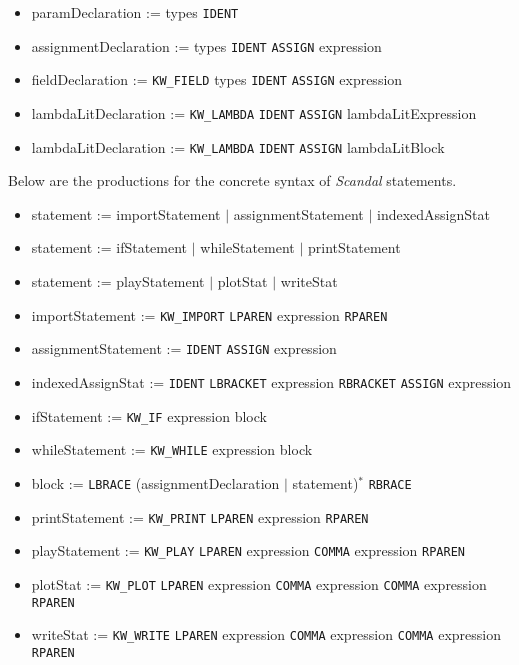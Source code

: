 \begin{itemize}
	\item paramDeclaration := types \texttt{IDENT}
	\item assignmentDeclaration := types \texttt{IDENT} \texttt{ASSIGN} expression
	\item fieldDeclaration := \texttt{KW\_FIELD} types \texttt{IDENT} \texttt{ASSIGN} expression	
	\item lambdaLitDeclaration := \texttt{KW\_LAMBDA} \texttt{IDENT} \texttt{ASSIGN} lambdaLitExpression
	\item lambdaLitDeclaration := \texttt{KW\_LAMBDA} \texttt{IDENT} \texttt{ASSIGN} lambdaLitBlock
\end{itemize}

Below are the productions for the concrete syntax of \emph{Scandal} statements.

\begin{itemize}
	\item statement := importStatement $|$ assignmentStatement $|$ indexedAssignStat
	\item statement := ifStatement $|$ whileStatement $|$ printStatement
	\item statement := playStatement $|$ plotStat $|$ writeStat
	\item importStatement := \texttt{KW\_IMPORT} \texttt{LPAREN} expression \texttt{RPAREN}
	\item assignmentStatement := \texttt{IDENT} \texttt{ASSIGN} expression
	\item indexedAssignStat := \texttt{IDENT} \texttt{LBRACKET} expression \texttt{RBRACKET} \texttt{ASSIGN} expression
	\item ifStatement := \texttt{KW\_IF} expression block
	\item whileStatement := \texttt{KW\_WHILE} expression block
	\item block := \texttt{LBRACE} (assignmentDeclaration $|$ statement)$^*$ \texttt{RBRACE}
	\item printStatement := \texttt{KW\_PRINT} \texttt{LPAREN} expression \texttt{RPAREN}
	\item playStatement := \texttt{KW\_PLAY} \texttt{LPAREN} expression \texttt{COMMA} expression \texttt{RPAREN}
	\item plotStat := \texttt{KW\_PLOT} \texttt{LPAREN} expression \texttt{COMMA} expression \texttt{COMMA} expression \texttt{RPAREN}
	\item writeStat := \texttt{KW\_WRITE} \texttt{LPAREN} expression \texttt{COMMA} expression \texttt{COMMA} expression \texttt{RPAREN}
\end{itemize}

